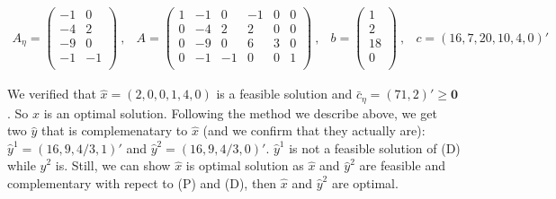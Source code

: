 \[
\begin{array}{cccc}
A_\eta =  \left(
  \begin{array}{cc}
    -1 & 0\\
    -4 & 2\\
    -9 &  0\\
    -1 & -1\\
  \end{array}
\right)~, &

A  =  \left(
  \begin{array}{cccccc}
    1 & -1 & 0 & -1 & 0 & 0   \\
    0 & -4 & 2 & 2 & 0 & 0 \\
    0 & -9 & 0 & 6 & 3 & 0\\
    0 & -1 & -1 & 0 & 0 & 1  \\
  \end{array}
\right)~,&

b  =  \left(
  \begin{array}{c}
    1   \\
    2 \\
    18\\
    0\\
  \end{array}
\right)~, & 

c = (16,7,20,10,4,0)'

\end{array}
\]

We verified that $\hat{x}=(2,0,0,1,4,0)$ is a feasible solution and $\bar{c}_\eta = (71,2)'\geq \mathbf{0}$. So $\hat{x}$ is an optimal solution. Following the method we describe above, we get two $\hat{y}$ that is complemenatary to $\hat{x}$ (and we confirm that they actually are): $\hat{y}^1=(16,9,4/3,1)'$ and $\hat{y}^2=(16,9,4/3,0)'$. $\hat{y}^1$ is not a feasible solution of (D) while $\hat{y}^2$ is. Still, we can show $\hat{x}$ is optimal solution as $\hat{x}$ and $\hat{y}^2$ are feasible and complementary with repect to (P) and (D), then $\hat{x}$ and $\hat{y}^2$ are optimal.